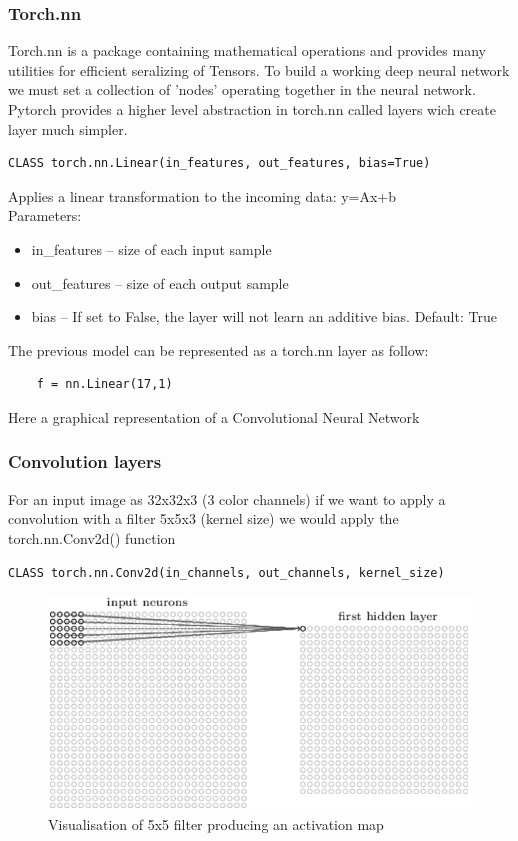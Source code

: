 \subsubsection{Torch.nn}
Torch.nn is a package containing mathematical operations and provides many utilities for efficient seralizing of Tensors.
To build a working deep neural network we must set a collection of 'nodes' operating together in the neural network. 
Pytorch provides a higher level abstraction in torch.nn called layers wich create layer much simpler.
\begin{lstlisting}
CLASS torch.nn.Linear(in_features, out_features, bias=True)
\end{lstlisting}
Applies a linear transformation to the incoming data: y=Ax+b 
\newline
\\
Parameters:

\begin{itemize}
    \item in\_features – size of each input sample
    \item out\_features – size of each output sample
    \item bias – If set to False, the layer will not learn an additive bias. Default: True
\end{itemize}

\noindent The previous model can be represented as a torch.nn layer as follow:
    \begin{lstlisting}
    f = nn.Linear(17,1) 
    \end{lstlisting}
Here a graphical representation of a Convolutional Neural Network 
\subsubsection{Convolution layers}
For an input image as 32x32x3 (3 color channels) if we want to apply a convolution with a filter 5x5x3 (kernel size) we would apply the torch.nn.Conv2d() function

\begin{lstlisting}
CLASS torch.nn.Conv2d(in_channels, out_channels, kernel_size)
\end{lstlisting}

\begin{figure}[!ht]
    \center
    \includegraphics[scale=0.5]{figures/conv2d.png}
    \caption{Visualisation of 5x5 filter producing an activation map}
\end{figure}


